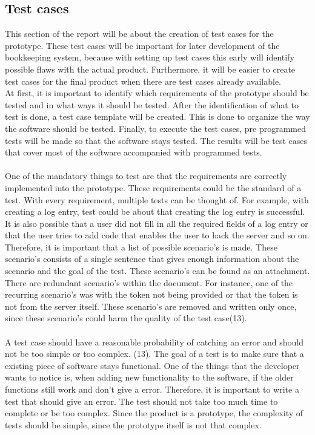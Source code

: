 \documentclass[paper=a4, fontsize=11pt,twoside]{scrartcl}	%
\begin{document}
\newpage
\subsection{Test cases}
This section of the report will be about the creation of test cases for the prototype. These test cases will be important for later development of the bookkeeping system, because with setting up test cases this early will identify possible flaws with the actual product.
Furthermore, it will be easier to create test cases for the final product when there are test cases already available. \\
At first, it is important to identify which requirements of the prototype should be tested and in what ways it should be tested. After the identification of what to test is done, a test case template will be created. This is done to organize the way the software should be tested. Finally, to execute the test cases, pre programmed tests will be made so that the software stays tested. The results will be test cases that cover most of the software accompanied with programmed tests. \\ \\
One of the mandatory things to test are that the requirements are correctly implemented into the prototype. These requirements could be the standard of a test. With every requirement, multiple tests can be thought of. For example, with creating a log entry, test could be about that creating the log entry is successful. It is also possible that a user did not fill in all the required fields of a log entry or that the user tries to add code that enables the user to hack the server and so on.  \\
Therefore, it is important that a list of possible scenario's is made. These scenario's consists of a single sentence that gives enough information about the scenario and the goal of the test. These scenario's can be found as an attachment. There are redundant scenario's within the document. For instance, one of the recurring scenario's was with the token not being provided or that the token is not from the server itself. These scenario's are removed and written only once, since these scenario's could harm the quality of the test case(13). \\ \\
A test case should have a reasonable probability of catching an error and should not be too simple or too complex. (13). The goal of a test is to make sure that a existing piece of software stays functional. One of the things that the developer wants to notice is, when adding new functionality to the software, if the older functions still work and don't give a error. Therefore, it is important to write a test  that should give an error. The test should not take too much time to complete or be too complex. Since the product is a prototype, the complexity of tests should be simple, since the prototype itself is not that complex. \\ 
\end{document}
